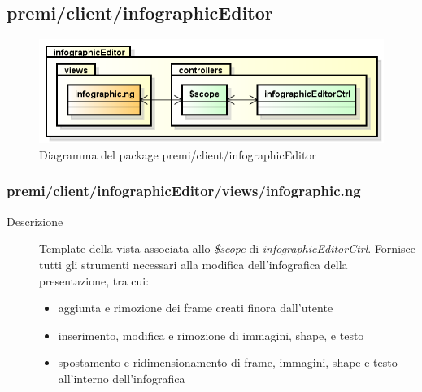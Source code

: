 \clearpage
\subsection{premi/client/infographicEditor}
\begin{figure}[H]
\begin{center}
\includegraphics[scale=0.85]{img/diapkg/infographicEditor.png}
\caption{Diagramma del package premi/client/infographicEditor}
\end{center}
\end{figure}



\subsubsection{premi/client/infographicEditor/views/infographic.ng}

\begin{description}
\item[Descrizione] \hfill
	Template della vista associata allo \textit{\$scope} di \textit{infographicEditorCtrl}. Fornisce tutti gli strumenti necessari alla modifica dell'infografica della presentazione, tra cui:
	\begin{itemize}
			\item aggiunta e rimozione dei frame creati finora dall'utente
			\item inserimento, modifica e rimozione di immagini, shape, e testo
			\item spostamento e ridimensionamento di frame, immagini, shape  e testo all'interno dell'infografica
	\end{itemize}
\end{description}



















